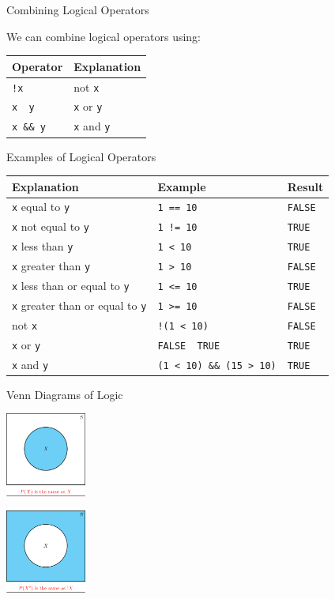 \begin{frame}[fragile]{Combining Logical Operators}

We can combine logical operators using:

\begin{longtable}[c]{@{}ll@{}}
\toprule
Operator & Explanation\tabularnewline
\midrule
\endhead
\texttt{!x} & not \texttt{x}\tabularnewline
\texttt{x\ \textbar{}\textbar{}\ y} & \texttt{x} or
\texttt{y}\tabularnewline
\texttt{x\ \&\&\ y} & \texttt{x} and \texttt{y}\tabularnewline
\bottomrule
\end{longtable}

\end{frame}

\begin{frame}[fragile]{Examples of Logical Operators}

\begin{longtable}[c]{@{}lll@{}}
\toprule
Explanation & Example & Result\tabularnewline
\midrule
\endhead
\texttt{x} equal to \texttt{y} & \texttt{1\ ==\ 10} &
\texttt{FALSE}\tabularnewline
\texttt{x} not equal to \texttt{y} & \texttt{1\ !=\ 10} &
\texttt{TRUE}\tabularnewline
\texttt{x} less than \texttt{y} & \texttt{1\ \textless{}\ 10} &
\texttt{TRUE}\tabularnewline
\texttt{x} greater than \texttt{y} & \texttt{1\ \textgreater{}\ 10} &
\texttt{FALSE}\tabularnewline
\texttt{x} less than or equal to \texttt{y} &
\texttt{1\ \textless{}=\ 10} & \texttt{TRUE}\tabularnewline
\texttt{x} greater than or equal to \texttt{y} &
\texttt{1\ \textgreater{}=\ 10} & \texttt{FALSE}\tabularnewline
not \texttt{x} & \texttt{!(1\ \textless{}\ 10)} &
\texttt{FALSE}\tabularnewline
\texttt{x} or \texttt{y} & \texttt{FALSE\ \textbar{}\textbar{}\ TRUE} &
\texttt{TRUE}\tabularnewline
\texttt{x} and \texttt{y} &
\texttt{(1\ \textless{}\ 10)\ \&\&\ (15\ \textgreater{}\ 10)} &
\texttt{TRUE}\tabularnewline
\bottomrule
\end{longtable}

\end{frame}

\begin{frame}{Venn Diagrams of Logic}

\begin{center}\includegraphics[width=100px]{figures/venn_diagram_x_v2} \end{center}

\begin{center}\includegraphics[width=100px]{figures/venn_diagram_notx_v2} \end{center}

\end{frame}

